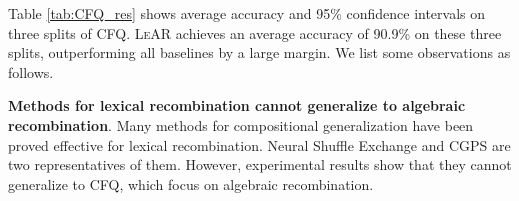 \documentclass[11pt,a4paper]{article}
\begin{document}
\begin{table}[t]
    \centering
    \caption{Accuracy on COGS benchmark. }
    \label{result:COGS}
\end{table}

\begin{table}[t]
    \centering
    \caption{Accuracy on GEO benchmark. }
    \label{result:GEO}
\end{table}

Table \ref{tab:CFQ_res} shows average accuracy and 95\% confidence intervals on three splits of CFQ.
\textsc{LeAR} achieves an average accuracy of 90.9\% on these three splits, outperforming all baselines by a large margin.
We list some observations as follows.

\noindent \textbf{Methods for lexical recombination cannot generalize to algebraic recombination}.
Many methods for compositional generalization have been proved effective for lexical recombination.
Neural Shuffle Exchange and CGPS are two representatives of them.
However, experimental results show that they cannot generalize to CFQ, which focus on algebraic recombination.
\end{document}
